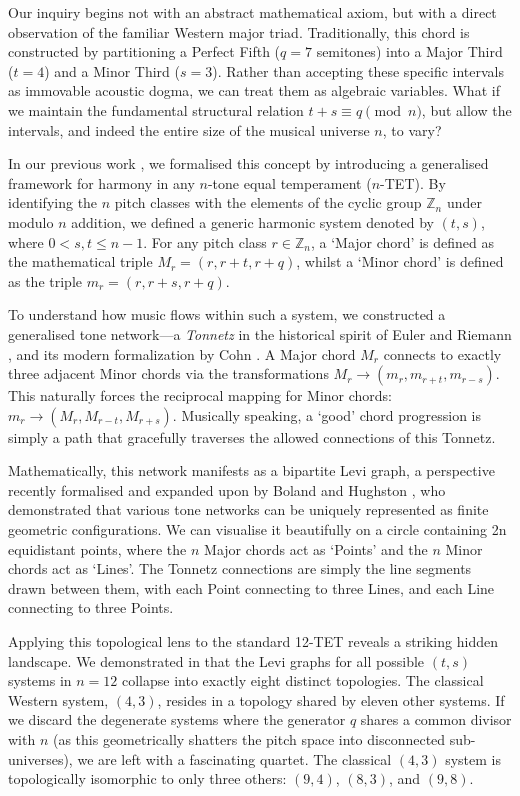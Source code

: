 \documentclass[11pt,letterpaper]{amsart}
\newcommand{\Z}{\mathbb{Z}}
\begin{document}
Our inquiry begins not with an abstract mathematical axiom, but with a direct observation of the familiar Western major triad. Traditionally, this chord is constructed by partitioning a Perfect Fifth ($q = 7$ semitones) into a Major Third ($t = 4$) and a Minor Third ($s = 3$). Rather than accepting these specific intervals as immovable acoustic dogma, we can treat them as algebraic variables. What if we maintain the fundamental structural relation $t + s \equiv q \pmod{n}$, but allow the intervals, and indeed the entire size of the musical universe $n$, to vary?

In our previous work \cite{nur1}, we formalised this concept by introducing a generalised framework for harmony in any $n$-tone equal temperament ($n$-TET). By identifying the $n$ pitch classes with the elements of the cyclic group $\Z_n$ under modulo $n$ addition, we defined a generic harmonic system denoted by $(t,s)$, where $0 < s, t \le n-1$. For any pitch class $r \in \Z_n$, a `Major chord' is defined as the mathematical triple $M_r = (r, r+t, r+q)$, whilst a `Minor chord' is defined as the triple $m_r = (r, r+s, r+q)$.

To understand how music flows within such a system, we constructed a generalised tone network---a \textit{Tonnetz} in the historical spirit of Euler \cite{euler_tentamen} and Riemann \cite{riemann_ideen}, and its modern formalization by Cohn \cite{cohn_audacious}. A Major chord $M_r$ connects to exactly three adjacent Minor chords via the transformations $M_r \to (m_r, m_{r+t}, m_{r-s})$. This naturally forces the reciprocal mapping for Minor chords: $m_r \to (M_r, M_{r-t}, M_{r+s})$. Musically speaking, a `good' chord progression is simply a path that gracefully traverses the allowed connections of this Tonnetz. 


Mathematically, this network manifests as a bipartite Levi graph, a perspective recently formalised and expanded upon by Boland and Hughston \cite{boland_hughston_2025, boland_hughston_2026}, who demonstrated that various tone networks can be uniquely represented as finite geometric configurations. We can visualise it beautifully on a circle containing 2n equidistant points, where the $n$ Major chords act as `Points' and the $n$ Minor chords act as `Lines'. The Tonnetz connections are simply the line segments drawn between them, with each Point connecting to three Lines, and each Line connecting to three Points.

Applying this topological lens to the standard 12-TET reveals a striking hidden landscape. We demonstrated in \cite{nur1} that the Levi graphs for all possible $(t,s)$ systems in $n=12$ collapse into exactly eight distinct topologies. The classical Western system, $(4,3)$, resides in a topology shared by eleven other systems. If we discard the degenerate systems where the generator $q$ shares a common divisor with $n$ (as this geometrically shatters the pitch space into disconnected sub-universes), we are left with a fascinating quartet. The classical $(4,3)$ system is topologically isomorphic to only three others: $(9,4)$, $(8,3)$, and $(9,8)$.
\end{document}
